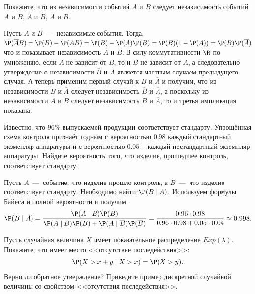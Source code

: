 \begin{problem}[37]
    Покажите, что из независимости событий $A$ и $B$ следует независимость событий $A$ и $\overline{B}$, $\overline{A}$ и $B$, $\overline{A}$ и $\overline{B}$.
\end{problem}
\begin{solution}
    Пусть $A$ и $B$~---~независимые события. Тогда, $\P(\overline{A}B) = \P(B) - \P(AB) = \P(B) - \P(A)\P(B) = \P(B)(1 - \P(A)) = \P(B)\P(\overline{A})$ что и показывает независимость $\overline{A}$ и $B$.
    В силу коммутативности $\R$ по умножению, если $A$ не зависит от $B$, то и $B$ не зависит от $A$, а следовательно утверждение о независимости $\overline{B}$ и $A$ является частным случаем предыдущего случая. А теперь применим первый случай к $B$ и $\overline{A}$ и получим, что из независимости $B$ и $\overline{A}$ следует независимость $\overline{B}$ и $\overline{A}$, а поскольку из независимости $A$ и $B$ следует независимость $B$ и $\overline{A}$, то и третья импликация показана.
\end{solution}
\begin{problem}[47]
    Известно, что $96\%$ выпускаемой продукции соответствует стандарту.
    Упрощённая схема контроля признаёт годным с вероятностью $0.98$ каждый стандартный экзмепляр аппаратуры и с вероятностью $0.05$ -- каждый нестандартный экземпляр аппаратуры.
    Найдите вероятность того, что изделие, прошедшее контроль, соответствует стандарту.
\end{problem}
\begin{solution}
    Пусть $A$~---~событие, что изделие прошло контроль, а $B$~---~что изделие соответствует стандарту.
    Необходимо найти $\P(B \mid A)$.
    Используем формулы Байеса и полной вероятности и получим:
    \[
        \P(B \mid A) = \dfrac{\P(A \mid B)\P(B)}{\P(A \mid B)\P(B) + \P(A \mid \overline{B})\P(\overline{B})} = \dfrac{0.96 \cdot 0.98}{0.96 \cdot 0.98 + 0.05 \cdot 0.04} \approx 0.998.
    \]
\end{solution}
\begin{problem}[50]
    Пусть случайная величина $X$ имеет показательное распределение $Exp(\lambda)$.
    Покажите, что имеет место <<отсутствие последействия>>:
    \[
        \P(X > x + y \mid X > x) = \P(X > y).
    \]
    Верно ли обратное утверждение?
    Приведите пример дискретной случайной величины со свойством <<отсутствия последействия>>.
\end{problem}

